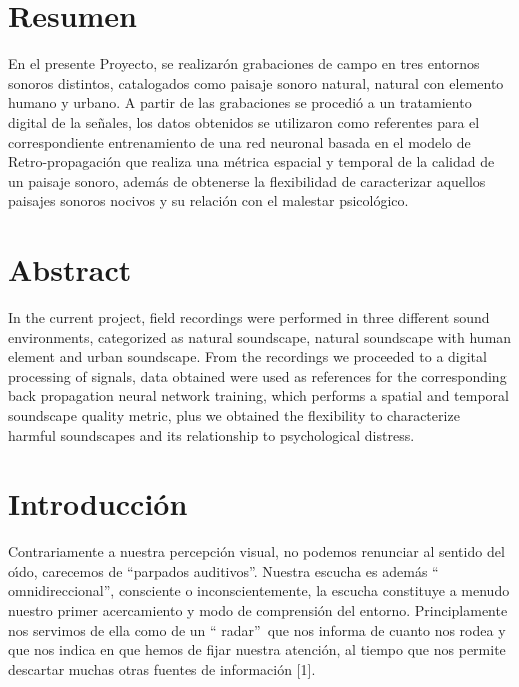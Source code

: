 \section*{Resumen }

En el presente Proyecto, se realizar\'{o}n grabaciones de campo en tres
entornos sonoros distintos, catalogados como paisaje sonoro natural, natural
con elemento humano y urbano. A partir de las grabaciones se procedi\'{o} a un
tratamiento digital de la se\~{n}ales, los datos obtenidos se utilizaron como
referentes para el correspondiente entrenamiento de una red neuronal basada en
el modelo de Retro-propagaci\'{o}n que realiza una m\'{e}trica espacial y
temporal de la calidad de un paisaje sonoro, adem\'{a}s de obtenerse la
flexibilidad de caracterizar aquellos paisajes sonoros nocivos y su
relaci\'{o}n con el malestar psicol\'{o}gico.

\section*{Abstract }

In the current project, field recordings were performed in three different
sound environments, categorized as natural soundscape, natural soundscape with
human element and urban soundscape. From the recordings we proceeded to a
digital processing of signals, data obtained were used as references for the
corresponding back propagation neural network training, which performs a
spatial and temporal soundscape quality metric, plus we obtained the
flexibility to characterize harmful soundscapes and its relationship to
psychological distress.

\section{Introducci\'{o}n}

Contrariamente a nuestra percepci\'{o}n visual, no podemos renunciar al
sentido del o\'{\i}do, carecemos de \textquotedblleft parpados
auditivos\textquotedblright. Nuestra escucha es adem\'{a}s \textquotedblleft
omnidireccional\textquotedblright, consciente o inconscientemente, la escucha
constituye a menudo nuestro primer acercamiento y modo de comprensi\'{o}n del
entorno. Principlamente nos servimos de ella como de un \textquotedblleft
radar\textquotedblright\ que nos informa de cuanto nos rodea y que nos indica
en que hemos de fijar nuestra atenci\'{o}n, al tiempo que nos permite
descartar muchas otras fuentes de informaci\'{o}n [1].

